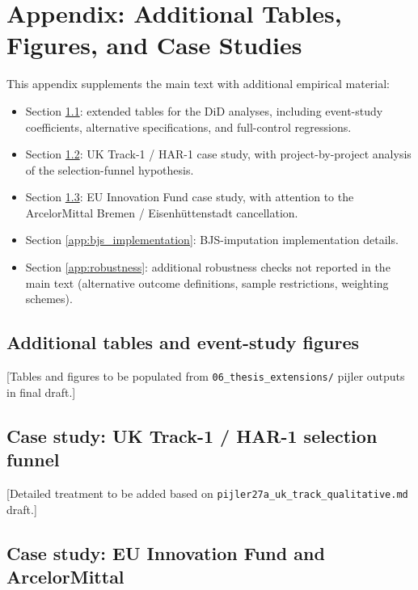 \appendix

\chapter{Appendix: Additional Tables, Figures, and Case Studies}
\label{app:case_studies}

This appendix supplements the main text with additional empirical material:

\begin{itemize}[leftmargin=2em]
\item Section \ref{app:additional_tables}: extended tables for the DiD analyses, including event-study coefficients, alternative specifications, and full-control regressions.
\item Section \ref{app:case_uk_track}: UK Track-1 / HAR-1 case study, with project-by-project analysis of the selection-funnel hypothesis.
\item Section \ref{app:case_eu_if}: EU Innovation Fund case study, with attention to the ArcelorMittal Bremen / Eisenhüttenstadt cancellation.
\item Section \ref{app:bjs_implementation}: BJS-imputation implementation details.
\item Section \ref{app:robustness}: additional robustness checks not reported in the main text (alternative outcome definitions, sample restrictions, weighting schemes).
\end{itemize}

\section{Additional tables and event-study figures}
\label{app:additional_tables}

[Tables and figures to be populated from \texttt{06\_thesis\_extensions/} pijler outputs in final draft.]

\section{Case study: UK Track-1 / HAR-1 selection funnel}
\label{app:case_uk_track}

[Detailed treatment to be added based on \texttt{pijler27a\_uk\_track\_qualitative.md} draft.]

\section{Case study: EU Innovation Fund and ArcelorMittal}
\label{app:case_eu_if}

